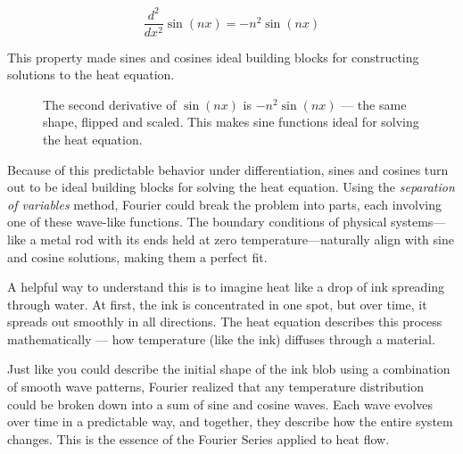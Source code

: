 \[
\frac{d^2}{dx^2} \sin(nx) = -n^2 \sin(nx)
\]

This property made sines and cosines ideal building blocks for constructing solutions to the heat equation.

\begin{figure}[H]
\centering
{}
\caption{The second derivative of $\sin(nx)$ is $-n^2 \sin(nx)$ — the same shape, flipped and scaled. This makes sine functions ideal for solving the heat equation.}
\end{figure}



Because of this predictable behavior under differentiation, sines and cosines turn out to be ideal building blocks for solving the heat equation. Using the \textit{separation of variables} method, Fourier could break the problem into parts, each involving one of these wave-like functions. The boundary conditions of physical systems—like a metal rod with its ends held at zero temperature—naturally align with sine and cosine solutions, making them a perfect fit.

A helpful way to understand this is to imagine heat like a drop of ink spreading through water. At first, the ink is concentrated in one spot, but over time, it spreads out smoothly in all directions. The heat equation describes this process mathematically — how temperature (like the ink) diffuses through a material.


Just like you could describe the initial shape of the ink blob using a combination of smooth wave patterns, Fourier realized that any temperature distribution could be broken down into a sum of sine and cosine waves. Each wave evolves over time in a predictable way, and together, they describe how the entire system changes. This is the essence of the Fourier Series applied to heat flow.


